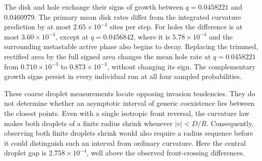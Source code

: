 The disk and hole exchange their signs of growth between $q=0.0458221$
and 0.0460979. The primary mean disk rates differ from the integrated
curvature prediction by at most $2.65\times10^{-4}$ sites per step.
For holes the difference is at most $3.60\times10^{-4}$, except at
$q=0.0456842$, where it is $5.78\times10^{-4}$ and the surrounding
metastable active phase also begins to decay. Replacing the trimmed,
rectified area by the full signed area changes the mean hole rate at
$q=0.0458221$ from $0.710\times10^{-3}$ to $0.873\times10^{-3}$,
without changing its sign. The complementary growth signs persist in
every individual run at all four sampled probabilities.

These coarse droplet measurements locate opposing invasion tendencies.
They do not determine whether an asymptotic interval of generic
coexistence lies between the closest points. Even with a single isotropic
front reversal, the curvature law makes both droplets of a finite radius
shrink whenever $|v|<D/R$. Consequently, observing both finite droplets
shrink would also require a radius sequence before it could distinguish
such an interval from ordinary curvature. Here the central droplet gap
is $2.758\times10^{-4}$, well above the observed front-crossing differences.

